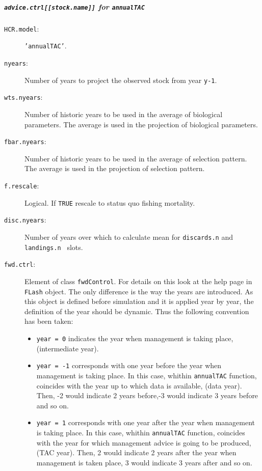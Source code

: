 \subparagraph{\texttt{advice.ctrl[[stock.name]]} for \texttt{annualTAC}}

	\begin{description}
		\item[\texttt{HCR.model}:] \texttt{'annualTAC'}.
		\item[\texttt{nyears}:] Number of years to project the observed stock from year \texttt{y-1}.
		\item[\texttt{wts.nyears}:] Number of historic years to be used in the average of biological parameters. 
			The average is used in the projection of biological parameters.
		\item[\texttt{fbar.nyears}:] Number of historic years to be used in the average of selection pattern. 
			The average is used in the projection of selection pattern.
		\item[\texttt{f.rescale}:] Logical.  If \texttt{TRUE} rescale to status quo fishing mortality.
		\item[\texttt{disc.nyears}:] Number of years over which to calculate mean for
          	\texttt{discards.n} and \texttt{landings.n } slots. 
		\item[\texttt{fwd.ctrl}:] Element of class \texttt{fwdControl}. For details on this look at the help page in \texttt{FLash}
			object. The only difference is the way the years are introduced. As this object is defined before simulation 
			and it is applied year by year, the definition of the year should be dynamic. Thus the following convention
			has been taken:
				\begin{itemize}
					\item \texttt{year = 0} indicates the year when management is taking place, (intermediate year).
					\item \texttt{year = -1} corresponds with one year before the year when management is taking place. 
						In this case, whithin \texttt{annualTAC} function, coincides with the year up to which data is available, (data year). 
						Then,  -2 would indicate 2 years before,-3 would indicate 3 years before and so on. 
					\item \texttt{year = 1} corresponds with one year after the year when management is taking place.  
						In this case, whithin \texttt{annualTAC} function, coincides with the year for which management 
						advice is going to be produced, (TAC year).
						Then,  2 would indicate 2 years after the year when management is taken place, 
						3 would indicate 3 years after and so on. 
				\end{itemize}

\end{description}
